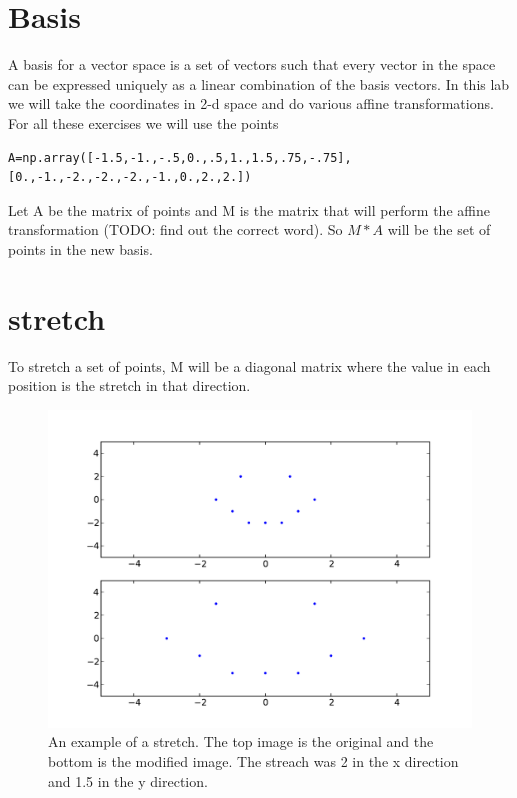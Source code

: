 \label{lab:ChangeBasis}


\section*{Basis}

A basis for a vector space is a set of vectors such that every vector in the space can be expressed uniquely as a linear combination of the basis vectors. In this lab we will take the coordinates in 2-d space and do various affine transformations. For all these exercises we will use the points
\begin{lstlisting}
A=np.array([-1.5,-1.,-.5,0.,.5,1.,1.5,.75,-.75],[0.,-1.,-2.,-2.,-2.,-1.,0.,2.,2.])
\end{lstlisting}
Let A be the matrix of points and M is the matrix that will perform the affine transformation (TODO: find out the correct word). So $M*A$ will be the set of points in the new basis. 

\section*{stretch}
To stretch a set of points, M will be a diagonal matrix where the value in each position is the stretch in that direction.

\begin{figure}[H]
\includegraphics[scale = .5]{strench.pdf}
\caption{An example of a stretch. The top image is the original and the bottom is the modified image. The streach was 2 in the x direction and 1.5 in the y direction.}
\end{figure}

